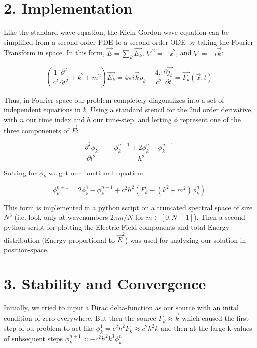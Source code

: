 \documentclass{article}
\begin{document}
	\section*{2. Implementation}
	
	Like the standard wave-equation, the Klein-Gordon wave equation can be simplified from a second order PDE to a second order ODE by taking the Fourier Transform in space. In this form, $\vec{E} = \sum_{k}\vec{E_k}$, $\nabla^2 = -k^2$, and $\nabla = -i\vec{k}$:
	
	\begin{equation}
		\left(\frac{1}{c^2}\frac{\partial^2}{\partial t^2} + k^2 + m^2\right)\vec{E_k} = 4\pi i \vec{k} \rho_k - \frac{4\pi}{c^2}\frac{\partial\vec{j_k}}{\partial t} = \vec{F_k}(\vec{x},t)
	\end{equation}
	
	Thus, in Fourier space our problem completely diagonalizes into a set of independent equations in $k$.
	Using a standard stencil for the 2nd order derivative, with $n$ our time index and $h$ our time-step, and letting $\phi$ represent one of the three componenets of $\vec{E}$:
	
	\begin{equation}
		\frac{\partial^2 \phi_k}{\partial t^2} = \frac{-\phi_k^{n+1} + 2\phi_k^{n} - \phi_k^{n-1}}{h^2}
	\end{equation}
	
	Solving for $\phi_k$ we get our functional equation:
	
	\begin{equation}\boxed{
		\phi_k^{n+1} = 2\phi_k^n - \phi_k^{n-1} + c^2h^2(F_k - (k^2+m^2)\phi_k^n)}
	\end{equation}
	
	This form is implemented in a python script on a truncated spectral space of size $N^3$ (i.e. look only at wavenumbers $2\pi m/N$ for $m \in [0,N-1]$). Then a second python script for plotting the Electric Field components and total Energy distribution (Energy proportional to $\vec{E}^2$) was used for analyzing our solution in position-space.
	
	\section*{3. Stability and Convergence}
	
	Initially, we tried to input a Dirac delta-function as our source with an inital condition of zero everywhere. But then the source $F_k \approx \vec{k}$ which caused the first step of ou problem to act like $\phi_k^{1} = c^2h^2 F_k \approx c^2h^2k$ and then at the large k values of subsequent steps $\phi_k^{n+1} \approx -c^2h^2k^3\phi_k^n$.
	
\end{document}
